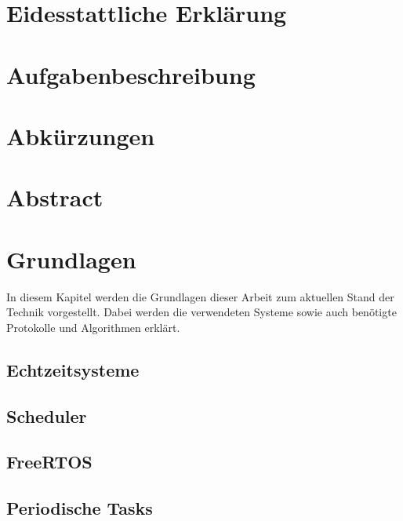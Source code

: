 \documentclass{scrartcl}
\begin{document}
	\begin{titlepage}
		
	\end{titlepage}
	\clearpage 
	\section*{Eidesstattliche Erklärung}
		
		\clearpage
	\section*{Aufgabenbeschreibung}
		
		\clearpage
	\tableofcontents
	\clearpage
	\listoffigures
	\listoftables
	\clearpage
	\lstlistoflistings
	\clearpage
	\section*{Abkürzungen}
		
		\clearpage
	\section*{Abstract}
		
	\clearpage
	\section{Grundlagen}
		In diesem Kapitel werden die Grundlagen dieser Arbeit zum aktuellen Stand der Technik vorgestellt.
		Dabei werden die verwendeten Systeme sowie auch benötigte Protokolle und Algorithmen erklärt.
		\subsection{Echtzeitsysteme} \label{section:echtzeitsysteme}
			
		\subsection{Scheduler} \label{section:scheduler}
			
		\subsection{FreeRTOS} \label{section:freertos}
			
		\subsection{Periodische Tasks} \label{section:periodische_tasks}
			
			\clearpage
\end{document}
